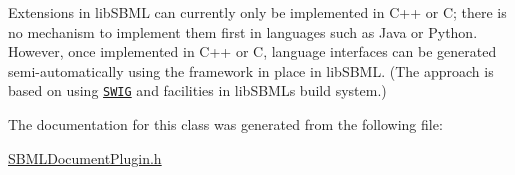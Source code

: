 Extensions in lib\+S\+B\+ML can currently only be implemented in C++ or C; there is no mechanism to implement them first in languages such as Java or Python. However, once implemented in C++ or C, language interfaces can be generated semi-\/automatically using the framework in place in lib\+S\+B\+ML. (The approach is based on using \href{http://www.swig.org}{\tt S\+W\+IG} and facilities in lib\+S\+B\+ML\textquotesingle{}s build system.) 

The documentation for this class was generated from the following file\+:\begin{DoxyCompactItemize}
\item 
\hyperlink{_s_b_m_l_document_plugin_8h}{S\+B\+M\+L\+Document\+Plugin.\+h}\end{DoxyCompactItemize}
